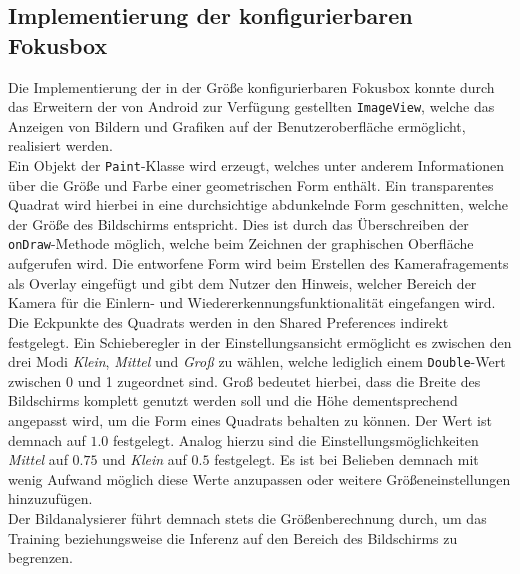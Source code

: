 \documentclass[oneside]{ausarbeitung}
\begin{document}
\subsection{Implementierung der konfigurierbaren Fokusbox}
Die Implementierung der in der Größe konfigurierbaren Fokusbox konnte durch das Erweitern der von Android zur Verfügung gestellten \texttt{ImageView}, welche das Anzeigen von Bildern und Grafiken auf der Benutzeroberfläche ermöglicht, realisiert werden.\\
Ein Objekt der \texttt{Paint}-Klasse wird erzeugt, welches unter anderem Informationen über die Größe und Farbe einer geometrischen Form enthält. Ein transparentes Quadrat wird hierbei in eine durchsichtige abdunkelnde Form geschnitten, welche der Größe des Bildschirms entspricht. Dies ist durch das Überschreiben der \texttt{onDraw}-Methode möglich, welche beim Zeichnen der graphischen Oberfläche aufgerufen wird. Die entworfene Form wird beim Erstellen des Kamerafragements als Overlay eingefügt und gibt dem Nutzer den Hinweis, welcher Bereich der Kamera für die Einlern- und Wiedererkennungsfunktionalität eingefangen wird.\\
Die Eckpunkte des Quadrats werden in den Shared Preferences indirekt festgelegt. Ein Schieberegler in der Einstellungsansicht ermöglicht es zwischen den drei Modi \textit{Klein}, \textit{Mittel} und \textit{Groß} zu wählen, welche lediglich einem \texttt{Double}-Wert zwischen 0 und 1 zugeordnet sind. Groß bedeutet hierbei, dass die Breite des Bildschirms komplett genutzt werden soll und die Höhe dementsprechend angepasst wird, um die Form eines Quadrats behalten zu können. Der Wert ist demnach auf $1.0$ festgelegt. Analog hierzu sind die Einstellungsmöglichkeiten \textit{Mittel} auf $0.75$ und \textit{Klein} auf $0.5$ festgelegt. Es ist bei Belieben demnach mit wenig Aufwand möglich diese Werte anzupassen oder weitere Größeneinstellungen hinzuzufügen.\\
Der Bildanalysierer führt demnach stets die Größenberechnung durch, um das Training beziehungsweise die Inferenz auf den Bereich des Bildschirms zu begrenzen.
\end{document}
